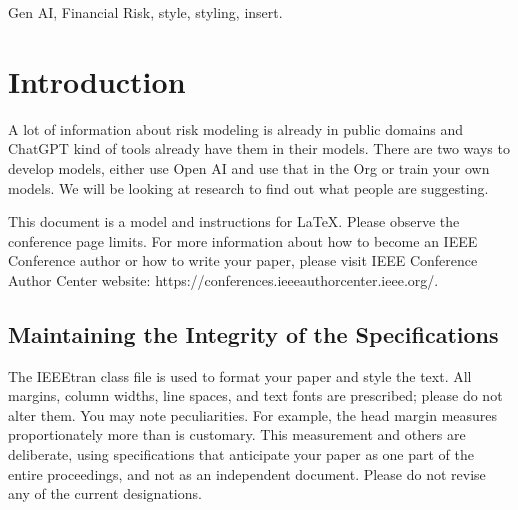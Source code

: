 \documentclass[conference]{IEEEtran}
\begin{document}
\begin{abstract}
In this paper we have proposed and demonstrated a protype on how to use GenAI in modeling Financial Risk Analysis.

Model development, validation and approval is an art and science. Mathematical models without human oversight can lead to failure. In this research we will look at how to use the current development in GenAi LLM to risk modeling.

This document is a model and instructions for \LaTeX.
This and the IEEEtran.cls file define the components of your paper [title, text, heads, etc.]. *CRITICAL: Do Not Use Symbols, Special Characters, Footnotes, 
or Math in Paper Title or Abstract.
\end{abstract}

\begin{IEEEkeywords}
Gen AI, Financial Risk, style, styling, insert.
\end{IEEEkeywords}

\section{Introduction}
A lot of information about risk modeling is already in public domains and ChatGPT kind of tools already have them in their models.
There are two ways to develop models, either use Open AI and use that in the Org or train your own models.
We will be looking at research to find out what people are suggesting.

This document is a model and instructions for \LaTeX.
Please observe the conference page limits. For more information about how to become an IEEE Conference author or how to write your paper, please visit   IEEE Conference Author Center website: https://conferences.ieeeauthorcenter.ieee.org/.

\subsection{Maintaining the Integrity of the Specifications}

The IEEEtran class file is used to format your paper and style the text. All margins, 
column widths, line spaces, and text fonts are prescribed; please do not 
alter them. You may note peculiarities. For example, the head margin
measures proportionately more than is customary. This measurement 
and others are deliberate, using specifications that anticipate your paper 
as one part of the entire proceedings, and not as an independent document. 
Please do not revise any of the current designations.
\end{document}
